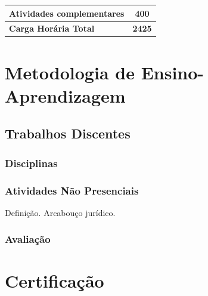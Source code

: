 \documentclass[11pt,fleqn]{book} %
\begin{document}
\begin{table}[]
{\begin{tabular}{|l|l|c|c|c|c|c|c|}
				\multicolumn{7}{|l|}{\textbf{Atividades complementares}}                                                                                                                                                         & \textbf{400}  \\ \hline
				\multicolumn{7}{|l|}{\textbf{Carga Horária Total}}                                                                                                                                                               & \textbf{2425} \\ \hline
			\end{tabular}%
		}
	\end{table}




\section{Metodologia de Ensino-Aprendizagem}\label{metodologia}


\subsection{Trabalhos Discentes}\label{trabdiscentes}

\subsubsection{Disciplinas}\label{dsiciplinas}


\subsubsection{Atividades Não Presenciais}

Definição. Arcabouço jurídico.


\subsubsection{Avaliação}


\section{Certificação}
\end{document}
